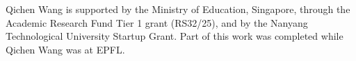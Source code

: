 \documentclass[acmsmall,dvipsnames]{acmart}
\begin{document}








\begin{acks}
Qichen Wang is supported by the Ministry of Education, Singapore, through the Academic Research Fund Tier 1 grant (RS32/25), and by the Nanyang Technological University Startup Grant. Part of this work was completed while Qichen Wang was at EPFL. 
\end{acks}



\end{document}
